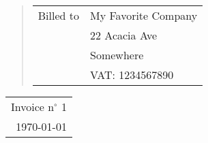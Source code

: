 \documentclass[a4paper]{report}
\author{Name Surname}
\def \clientHeading {Billed to}
\def \clientName {My Favorite Company}
\def \clientAddress {22 Acacia Ave}
\def \clientCity {Somewhere}
\def \clientVat {VAT: 1234567890}
\def \invoiceNumber {Invoice n$^{\circ}$ 1}
\def \invoiceDate {\today}
\begin{document}
\begin{minipage}[t]{\textwidth}
  \begin{verse}
    \begin{flushright}
      \begin{tabular}{rl}
        \clientHeading & \clientName
        \\
        & \clientAddress
        \\
        & \clientCity
        \\
        & \clientVat
      \end{tabular}
    \end{flushright}
  \end{verse}
\end{minipage}

\begin{minipage}[t]{\textwidth}
  \begin{flushleft}
    \begin{tabular}{r}
      \invoiceNumber
      \\
      \invoiceDate
    \end{tabular}
  \end{flushleft}
\end{minipage}
\end{document}
